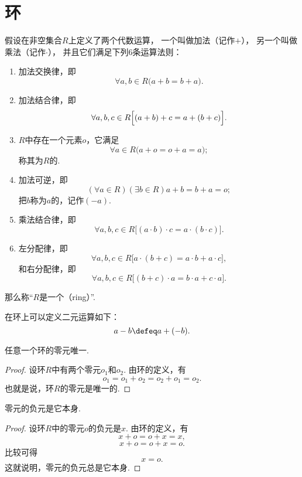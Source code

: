 
\section{环}
\begin{definition}
假设在非空集合\(R\)上定义了两个代数运算，
一个叫做加法（记作\(+\)），
另一个叫做乘法（记作\(\cdot\)），
并且它们满足下列6条运算法则：
\begin{enumerate}
    \item 加法交换律，即\[
        \forall a,b \in R \bigl(a+b = b+a\bigr).
    \]

    \item 加法结合律，即\[
        \forall a,b,c \in R \Bigl[(a+b)+c = a+(b+c)\Bigr].
    \]

    \item \(R\)中存在一个元素\(o\)，它满足\[
        \forall a \in R \bigl( a+o = o+a = a \bigr);
    \]
    称其为\(R\)的.

    \item 加法可逆，即\[
        (\forall a \in R)(\exists b \in R)
        a+b = b+a = o;
    \]
    把\(b\)称为\(a\)的，记作\((-a)\).

    \item 乘法结合律，即\[
        \forall a,b,c \in R
        \bigl[ (a \cdot b) \cdot c = a \cdot (b \cdot c) \bigr].
    \]

    \item 左分配律，即\[
        \forall a,b,c \in R \bigl[ a \cdot (b+c) = a \cdot b + a \cdot c \bigr],
    \]
    和右分配律，即\[
        \forall a,b,c \in R \bigl[ (b+c) \cdot a = b \cdot a + c \cdot a \bigr].
    \]
\end{enumerate}
那么称“\(R\)是一个（ring）”.
\end{definition}

在环上可以定义二元运算如下：\[
    a - b \defeq a + (-b).
\]

\begin{property}
任意一个环的零元唯一.
\begin{proof}
设环\(R\)中有两个零元\(o_1\)和\(o_2\).
由环的定义，有\[
    o_1 = o_1 + o_2 = o_2 + o_1 = o_2.
\]
也就是说，环\(R\)的零元是唯一的.
\end{proof}
\end{property}

\begin{property}
零元的负元是它本身.
\begin{proof}
设环\(R\)中的零元\(o\)的负元是\(x\).
由环的定义，有\[
    x + o = o + x = x,
\]\[
    x + o = o + x = o.
\]比较可得\[
    x = o.
\]
这就说明，零元的负元总是它本身.
\end{proof}
\end{property}


